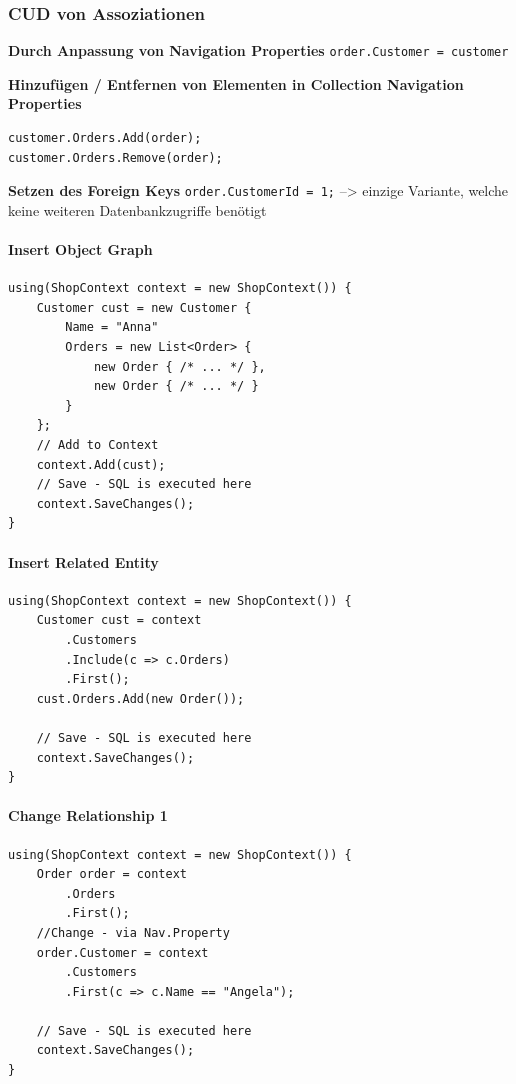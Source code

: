 \documentclass[
a4paper,
oneside,
10pt,
fleqn,
headsepline,
toc=listofnumbered, 
bibliography=totocnumbered]{scrartcl}
\begin{document}
\subsubsection{CUD von Assoziationen}
\textbf{Durch Anpassung von Navigation Properties}
\lstinline{order.Customer = customer}

\textbf{Hinzufügen / Entfernen von Elementen in Collection Navigation Properties}
\begin{lstlisting}
customer.Orders.Add(order);
customer.Orders.Remove(order);
\end{lstlisting}

\textbf{Setzen des Foreign Keys}
\lstinline{order.CustomerId = 1;}
--> einzige Variante, welche keine weiteren Datenbankzugriffe benötigt

\paragraph{Insert Object Graph}
\begin{lstlisting}
using(ShopContext context = new ShopContext()) {
    Customer cust = new Customer {
        Name = "Anna"
        Orders = new List<Order> {
            new Order { /* ... */ },
            new Order { /* ... */ }
        }
    };
    // Add to Context
    context.Add(cust);
    // Save - SQL is executed here
    context.SaveChanges();
}
\end{lstlisting}

\paragraph{Insert Related Entity}
\begin{lstlisting}
using(ShopContext context = new ShopContext()) {
    Customer cust = context
        .Customers
        .Include(c => c.Orders)
        .First();
    cust.Orders.Add(new Order());
    
    // Save - SQL is executed here
    context.SaveChanges();
}
\end{lstlisting}

\paragraph{Change Relationship 1}
\begin{lstlisting}
using(ShopContext context = new ShopContext()) {
    Order order = context
        .Orders
        .First();
    //Change - via Nav.Property
    order.Customer = context
        .Customers
        .First(c => c.Name == "Angela");
    
    // Save - SQL is executed here
    context.SaveChanges();
}
\end{lstlisting}
\end{document}
